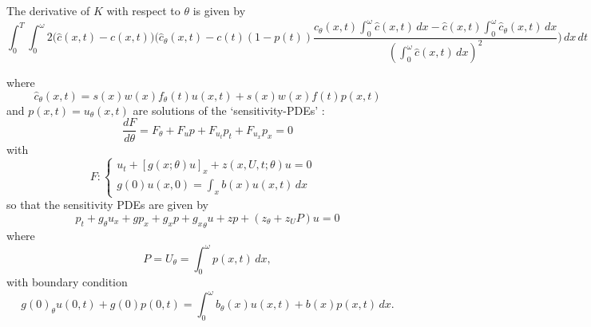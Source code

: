 \documentclass{article}
\begin{document}
The derivative of $K$ with respect to $\theta$ is given by
\begin{equation}
\int_0^T \int_0^\omega
2\big( \hat{c}(x,t)-c(x,t)\big)\big(\hat{c}_\theta(x,t)- c(t)(1-p(t))
\frac{\hat{c}_\theta(x,t)\int_0^\omega \hat{c}(x,t)\,dx - \hat{c}(x,t)\int_0^\omega \hat{c}_\theta(x,t)\,dx  }{(\int_0^\omega \hat{c}(x,t)\,dx)^2}   \big)\,dx\,dt
\end{equation}

where $$\hat{c}_\theta(x,t)=s(x)w(x)f_\theta(t)u(x,t)+s(x)w(x)f(t)p(x,t)$$
and $p(x,t)=u_\theta(x,t)$ are solutions of the `sensitivity-PDEs' \citep{Borggaard1997}: 
\begin{equation}
  \frac{d F}{d\theta} = F_\theta + F_u p + F_{u_t} p_t + F_{u_x} p_x = 0
\end{equation}
with
\begin{equation}
  F: \begin{cases}
    u_t + \left[g(x;\theta)u\right]_x + z(x,U,t;\theta)u = 0 &\\
    g(0)u(x,0) = \int_x b(x)u(x,t)\,dx & \end{cases}
\end{equation}
so that the sensitivity PDEs are given by
\begin{equation}
  p_t + g_\theta u_x + g p_x + g_x p + {g_x}_\theta u + z p + \left(z_\theta + z_U P\right)u = 0
\end{equation}
where
\begin{equation}
  P=U_\theta= \int_0^\omega p(x,t)\,dx,
\end{equation}
with boundary condition
\begin{equation}
  g(0)_\theta u(0,t) + g(0) p(0,t) = \int_0^\omega b_\theta(x)u(x,t) + b(x)p(x,t) \,dx .
\end{equation}
\end{document}
